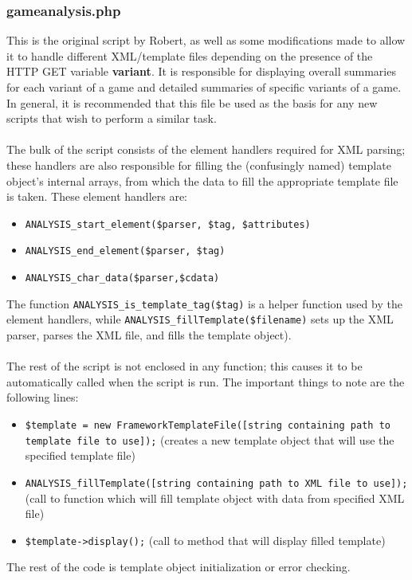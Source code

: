 \documentclass[11pt]{article}
\begin{document}
\subsubsection{gameanalysis.php}
This is the original script by Robert, as well as some modifications made to allow it to handle different XML/template files depending on the presence of the HTTP GET variable \textbf{variant}. It is responsible for displaying overall summaries for each variant of a game and detailed summaries of specific variants of a game. In general, it is recommended that this file be used as the basis for any new scripts that wish to perform a similar task.\\\\
The bulk of the script consists of the element handlers required for XML parsing; these handlers are also responsible for filling the (confusingly named) template object's internal arrays, from which the data to fill the appropriate template file is taken. These element handlers are:
\begin{itemize}
\item \texttt{ANALYSIS\_start\_element(\$parser, \$tag, \$attributes)}
\item \texttt{ANALYSIS\_end\_element(\$parser, \$tag)}
\item \texttt{ANALYSIS\_char\_data(\$parser,\$cdata)}
\end{itemize}
The function \texttt{ANALYSIS\_is\_template\_tag(\$tag)} is a helper function used by the element handlers, while \texttt{ANALYSIS\_fillTemplate(\$filename)} sets up the XML parser, parses the XML file, and fills the template object).\\\\
The rest of the script is not enclosed in any function; this causes it to be automatically called when the script is run. The important things to note are the following lines:
\begin{itemize}
\item \texttt{\$template = new FrameworkTemplateFile([string containing path to template file to use]);} (creates a new template object that will use the specified template file)
\item \texttt{ANALYSIS\_fillTemplate([string containing path to XML file to use]);} (call to function which will fill template object with data from specified XML file)
\item \texttt{\$template->display();} (call to method that will display filled template)
\end{itemize}
The rest of the code is template object initialization or error checking.
\end{document}
